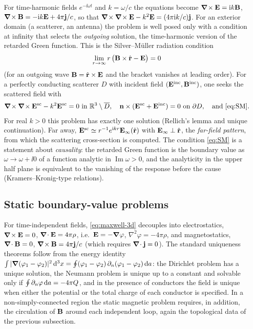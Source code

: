 For time-harmonic fields $e^{-\ii\omega t}$ and $k=\omega/c$ the equations
become $\boldsymbol{\nabla}\!\times\mathbf{E}=\mathrm{i} k\mathbf{B}$, $\boldsymbol{\nabla}\!\times\mathbf{B}=-\mathrm{i} k\mathbf{E}+4\pi\mathbf{j}/c$, so that
$\boldsymbol{\nabla}\!\times\boldsymbol{\nabla}\!\times\mathbf{E}-k^2\mathbf{E}=(4\pi\mathrm{i} k/c)\mathbf{j}$.  For an exterior domain (a
scatterer, an antenna) the problem
is well posed only with a condition at infinity that selects the
\emph{outgoing} solution, the time-harmonic version of the
retarded Green function.  This is the Silver--M\"uller radiation condition
\begin{equation}\label{eq:SM}
\lim_{r\to\infty}r\,\big(\mathbf{B}\times\hat{\mathbf r}-\mathbf{E}\big)=0
\end{equation}
(for an outgoing wave $\mathbf{B}=\hat{\mathbf r}\times\mathbf{E}$ and the bracket vanishes at leading order).
For a perfectly conducting scatterer $D$ with incident field
$(\mathbf{E}^{\rm inc},\mathbf{B}^{\rm inc})$, one seeks the scattered field with
\begin{equation}
\curl\curl\vE^{\rm sc}-k^2\vE^{\rm sc}=0\ \text{in }\mathbb R^3\setminus\overline D,\quad
\vn\times(\vE^{\rm sc}+\vE^{\rm inc})=0\ \text{on }\pa D,\quad\text{and \eqref{eq:SM}.}
\end{equation}
For real $k>0$ this problem has exactly one solution (Rellich's lemma
and unique continuation).  Far away, $\mathbf{E}^{\rm sc}\simeq r^{-1}e^{\mathrm{i} kr}\mathbf{E}_\infty(\hat{\mathbf r})$
with $\mathbf{E}_\infty\perp\hat{\mathbf r}$, the \emph{far-field pattern},
from which the scattering cross-section is computed.  The condition
\eqref{eq:SM} is a statement about \emph{causality}: the retarded Green
function is the boundary value as $\omega\to\omega+\ii0$ of a function
analytic in $\operatorname{Im}\omega>0$, and the
analyticity in the upper half plane is equivalent to the vanishing of
the response before the cause (Kramers--Kronig-type relations).

\subsection{Static boundary-value problems}

For time-independent fields, \eqref{eq:maxwell-3d} decouples into
electrostatics, $\boldsymbol{\nabla}\!\times\mathbf{E}=0$, $\boldsymbol{\nabla}\!\cdot\mathbf{E}=4\pi\rho$, i.e.\ $\mathbf{E}=-\boldsymbol{\nabla}\varphi$,
$\nabla^2\varphi=-4\pi\rho$, and magnetostatics, $\boldsymbol{\nabla}\!\cdot\mathbf{B}=0$,
$\boldsymbol{\nabla}\!\times\mathbf{B}=4\pi\mathbf{j}/c$ (which requires $\boldsymbol{\nabla}\!\cdot\mathbf{j}=0$).  The standard
uniqueness theorems follow from the energy identity
$\int|\boldsymbol{\nabla}(\varphi_1-\varphi_2)|^2\,\mathrm{d}^3x=\oint(\varphi_1-\varphi_2)\,\partial_n(\varphi_1-\varphi_2)\,\mathrm{d} a$:
the Dirichlet problem has a unique solution, the Neumann problem is unique
up to a constant and solvable only if $\oint\partial_n\varphi\,\mathrm{d} a=-4\pi Q$,
and in the presence of conductors the field is unique when either the
potential or the total charge of each conductor is specified.  In a
non-simply-connected region the static magnetic problem requires,
in addition, the circulation of $\mathbf{B}$ around each independent loop,
again the topological data of the previous subsection.

